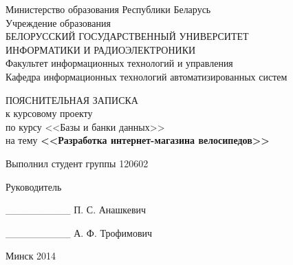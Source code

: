 \begin{titlepage}
\thispagestyle{empty}
\setlength{\parindent}{0ex} %

\begin{center}
  Министерство образования Республики Беларусь \\
  \smallskip
  Учреждение образования \\
  БЕЛОРУССКИЙ ГОСУДАРСТВЕННЫЙ УНИВЕРСИТЕТ \\
  ИНФОРМАТИКИ И РАДИОЭЛЕКТРОНИКИ \\
  \smallskip
  Факультет информационных технологий и управления \\
  \smallskip
  Кафедра информационных технологий автоматизированных систем
\end{center}

\vspace{50mm}

\begin{center}
  ПОЯСНИТЕЛЬНАЯ ЗАПИСКА \\
  к курсовому проекту \\
  по курсу <<Базы и банки данных>> \\
  на тему \textbf{<<Разработка интернет-магазина велосипедов>>} \\
\end{center}

\vspace{49mm}

\begin{minipage}{.55\linewidth}
    Выполнил студент группы 120602

    \smallskip

    Руководитель
\end{minipage}
\hfill
\begin{minipage}{.4\linewidth}
  \begin{flushright}
    \_\_\_\_\_\_\_\_\_ \hspace{1.7mm} П. С. Анашкевич

    \smallskip

    \_\_\_\_\_\_\_\_\_ А. Ф. Трофимович
  \end{flushright}
\end{minipage}

\vspace{50mm}
\begin{center}
  Минск 2014
\end{center}

\setlength{\parindent}{5ex} %
\end{titlepage}
